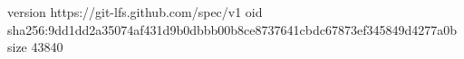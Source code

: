 version https://git-lfs.github.com/spec/v1
oid sha256:9dd1dd2a35074af431d9b0dbbb00b8ce8737641cbdc67873ef345849d4277a0b
size 43840
